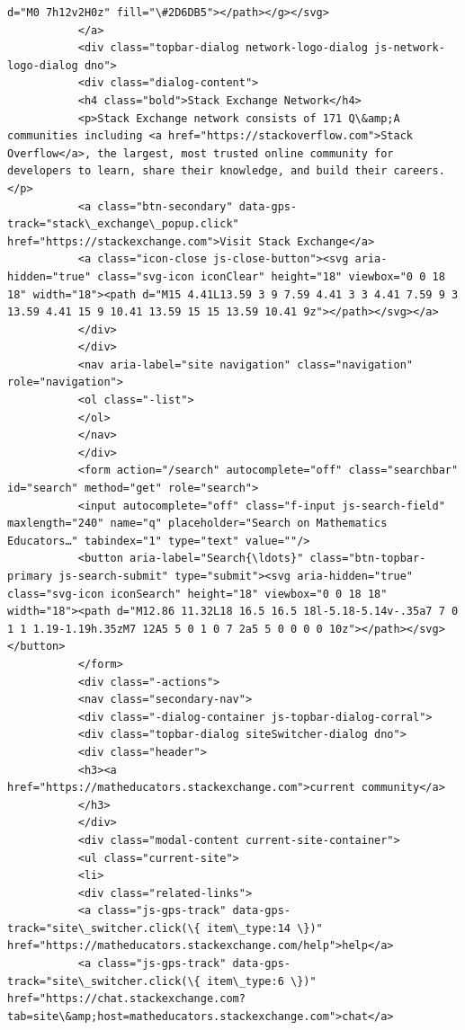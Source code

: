 \documentclass[11pt]{article}
\begin{document}
\begin{Verbatim}[commandchars=\\\{\}]
d="M0 7h12v2H0z" fill="\#2D6DB5"></path></g></svg>
           </a>
           <div class="topbar-dialog network-logo-dialog js-network-logo-dialog dno">
           <div class="dialog-content">
           <h4 class="bold">Stack Exchange Network</h4>
           <p>Stack Exchange network consists of 171 Q\&amp;A communities including <a href="https://stackoverflow.com">Stack Overflow</a>, the largest, most trusted online community for developers to learn, share their knowledge, and build their careers.</p>
           <a class="btn-secondary" data-gps-track="stack\_exchange\_popup.click" href="https://stackexchange.com">Visit Stack Exchange</a>
           <a class="icon-close js-close-button"><svg aria-hidden="true" class="svg-icon iconClear" height="18" viewbox="0 0 18 18" width="18"><path d="M15 4.41L13.59 3 9 7.59 4.41 3 3 4.41 7.59 9 3 13.59 4.41 15 9 10.41 13.59 15 15 13.59 10.41 9z"></path></svg></a>
           </div>
           </div>
           <nav aria-label="site navigation" class="navigation" role="navigation">
           <ol class="-list">
           </ol>
           </nav>
           </div>
           <form action="/search" autocomplete="off" class="searchbar" id="search" method="get" role="search">
           <input autocomplete="off" class="f-input js-search-field" maxlength="240" name="q" placeholder="Search on Mathematics Educators…" tabindex="1" type="text" value=""/>
           <button aria-label="Search{\ldots}" class="btn-topbar-primary js-search-submit" type="submit"><svg aria-hidden="true" class="svg-icon iconSearch" height="18" viewbox="0 0 18 18" width="18"><path d="M12.86 11.32L18 16.5 16.5 18l-5.18-5.14v-.35a7 7 0 1 1 1.19-1.19h.35zM7 12A5 5 0 1 0 7 2a5 5 0 0 0 0 10z"></path></svg></button>
           </form>
           <div class="-actions">
           <nav class="secondary-nav">
           <div class="-dialog-container js-topbar-dialog-corral">
           <div class="topbar-dialog siteSwitcher-dialog dno">
           <div class="header">
           <h3><a href="https://matheducators.stackexchange.com">current community</a>
           </h3>
           </div>
           <div class="modal-content current-site-container">
           <ul class="current-site">
           <li>
           <div class="related-links">
           <a class="js-gps-track" data-gps-track="site\_switcher.click(\{ item\_type:14 \})" href="https://matheducators.stackexchange.com/help">help</a>
           <a class="js-gps-track" data-gps-track="site\_switcher.click(\{ item\_type:6 \})" href="https://chat.stackexchange.com?tab=site\&amp;host=matheducators.stackexchange.com">chat</a>

\end{Verbatim}
\end{document}
